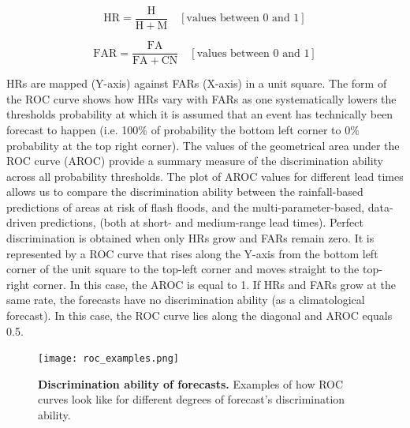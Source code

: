 \begin{equation}
\mathrm{HR} = \frac{\mathrm{H}}{\mathrm{H} + \mathrm{M}}\quad[\text{values between }0\text{ and }1]
\label{eq:hr}
\end{equation}

\begin{equation}
\mathrm{FAR} = \frac{\mathrm{FA}}{\mathrm{FA} + \mathrm{CN}}\quad[\text{values between }0\text{ and }1]
\label{eq:far}
\end{equation}

HRs are mapped (Y-axis) against FARs (X-axis) in a unit square. The form of the ROC curve shows how HRs vary with FARs as one systematically lowers the thresholds probability at which it is assumed that an event has technically been forecast to happen (i.e. 100\% of probability the bottom left corner to 0\% probability at the top right corner). The values of the geometrical area under the ROC curve (AROC) provide a summary measure of the discrimination ability across all probability thresholds. The plot of AROC values for different lead times allows us to compare the discrimination ability between the rainfall-based predictions of areas at risk of flash floods, and the multi-parameter-based, data-driven predictions, (both at short- and medium-range lead times). Perfect discrimination is obtained when only HRs grow and FARs remain zero. It is represented by a ROC curve that rises along the Y-axis from the bottom left corner of the unit square to the top-left corner and moves straight to the top-right corner. In this case, the AROC is equal to 1. If HRs and FARs grow at the same rate, the forecasts have no discrimination ability (as a climatological forecast). In this case, the ROC curve lies along the diagonal and AROC equals 0.5. 

\begin{figure}[htbp]
\centering
\texttt{[image: roc\_examples.png]}
\caption{\textbf{Discrimination ability of forecasts.} Examples of how ROC curves look like for different degrees of forecast's discrimination ability.}
\label{fig:roc_examples}
\end{figure}

